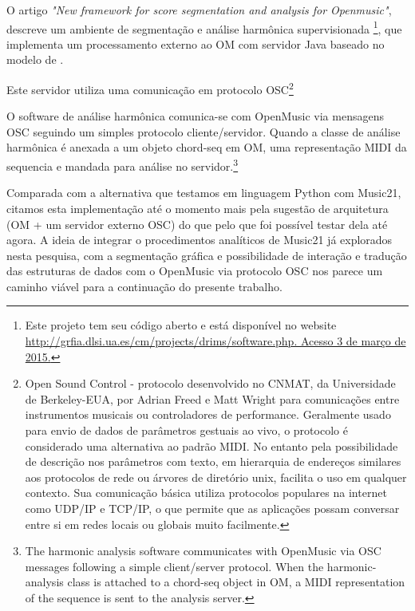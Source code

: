\documentclass[
	12pt,				%
	openright,			%
	twoside,			%
	a4paper,			%
	english,			%
	french,				%
	spanish,			%
	brazil				%
	]{abntex2}
\begin{document}
O artigo \textit{"New framework for score segmentation and analysis for Openmusic"}\cite{bresson2012new}, descreve um ambiente de segmentação e análise harmônica supervisionada \footnote{Este projeto tem seu código aberto e está disponível no website \url{http://grfia.dlsi.ua.es/cm/projects/drims/software.php. Acesso 3 de março de 2015.}}, que implementa um processamento externo ao OM com servidor Java baseado no modelo de .

Este servidor utiliza uma comunicação em protocolo OSC\footnote{Open Sound Control - protocolo desenvolvido no CNMAT, da Universidade de Berkeley-EUA, por Adrian Freed e Matt Wright para comunicações entre instrumentos musicais ou controladores de performance. Geralmente usado para envio de dados de parâmetros gestuais ao vivo, o protocolo é considerado uma alternativa ao padrão MIDI. No entanto pela possibilidade de descrição nos parâmetros com texto, em hierarquia de endereços similares aos protocolos de rede ou árvores de diretório unix, facilita o uso em qualquer contexto. Sua comunicação básica utiliza protocolos populares na internet como UDP/IP e TCP/IP, o que permite que as aplicações possam conversar entre si em redes locais ou globais muito facilmente. }

\begin{citacao}
O software de análise harmônica comunica-se com OpenMusic via mensagens OSC seguindo um simples protocolo cliente/servidor. Quando a classe de análise harmônica é anexada a um objeto chord-seq em OM, uma representação MIDI da sequencia e mandada para análise no servidor.\cite[ p.4]{bresson2012new}\footnote{The harmonic analysis software communicates with OpenMusic via OSC messages following a simple client/server protocol. When the harmonic-analysis class is attached to a chord-seq object in OM, a MIDI representation of the sequence is sent to the analysis server.\cite[ p.4]{bresson2012new}}
\end{citacao}		


Comparada com a alternativa que testamos em linguagem Python com Music21, citamos esta implementação até o momento mais pela sugestão de arquitetura (OM + um servidor externo OSC) do que pelo que foi possível testar dela até agora. A ideia de integrar o procedimentos analíticos de Music21 já explorados nesta pesquisa, com a segmentação gráfica e possibilidade de interação e tradução das estruturas de dados com o OpenMusic via protocolo OSC nos parece um caminho viável para a continuação do presente trabalho.
	
\end{document}
